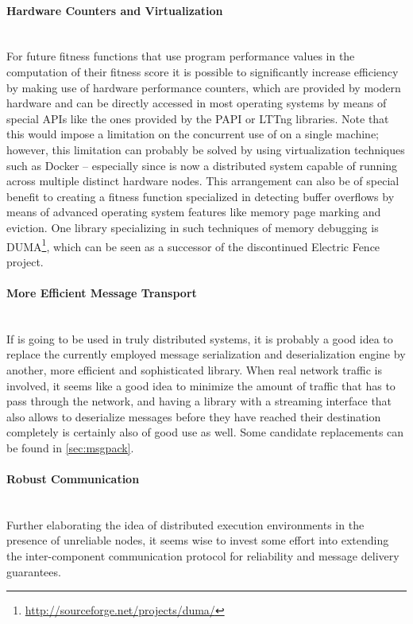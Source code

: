 \paragraph{Hardware Counters and Virtualization} ~\\
For future fitness functions that use program performance values in the computation of their
fitness score it is possible to significantly increase efficiency by making use of hardware performance
counters, which are provided by modern hardware and can be directly accessed in most operating systems by
means of special APIs like the ones provided by the PAPI\cite{Mucci99papi:a} or LTTng\cite{
combined_tracing_ols2009} libraries. Note that this would impose a limitation on the concurrent use of \xmlmate
on a single machine; however, this limitation can probably be solved by using virtualization techniques such as
Docker\cite{docker} -- especially since \xmlmate is now a
distributed system capable of running across multiple distinct hardware nodes. This arrangement can also be of
special benefit to creating a fitness function specialized in detecting buffer overflows by means of advanced
operating system features like memory page marking and eviction. One library specializing in such techniques
of memory debugging is DUMA\footnote{\url{http://sourceforge.net/projects/duma/}}, which can be seen as a
successor of the discontinued Electric Fence project.
\paragraph{More Efficient Message Transport} ~\\
If \xmlmate is going to be used in truly distributed systems, it is probably a good idea to replace
the currently employed \msgpack message serialization and deserialization engine by another, more efficient and
sophisticated library. When real network traffic is involved, it seems like a good idea to minimize the amount
of traffic that has to pass through the network, and having a library with a streaming interface that also
allows to deserialize messages before they have reached their destination completely is certainly also of
good use as well. Some candidate replacements can be found in \cref{sec:msgpack}.
\paragraph{Robust Communication} ~\\
Further elaborating the idea of distributed execution environments in the presence of unreliable
nodes, it seems wise to invest some effort into extending the inter-component communication protocol for
reliability and message delivery guarantees.
